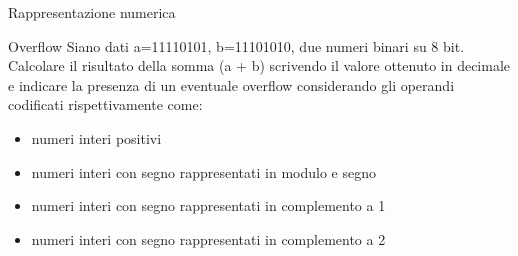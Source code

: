 \documentclass[11pt]{article}
\begin{document}
\begin{quiz}{Rappresentazione numerica}
\begin{cloze}[points=1,shuffle=false]{Overflow}
Siano dati a=11110101, b=11101010, due numeri binari su 8 bit.
Calcolare il risultato della somma (a + b) scrivendo il valore ottenuto in decimale e indicare la presenza di un eventuale overflow considerando gli operandi codificati rispettivamente come:
\begin{itemize}
\item numeri interi positivi
%
\item numeri interi con segno rappresentati in modulo e segno
%
\item numeri interi con segno rappresentati in complemento a 1
%
\item numeri interi con segno rappresentati in complemento a 2
\end{itemize}
\end{cloze}





\end{quiz}
\end{document}
